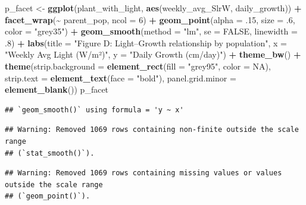 \documentclass[
]{article}
\newenvironment{Shaded}{\begin{snugshade}}{\end{snugshade}}
\newcommand{\AttributeTok}[1]{\textcolor[rgb]{0.13,0.29,0.53}{#1}}
\newcommand{\ConstantTok}[1]{\textcolor[rgb]{0.56,0.35,0.01}{#1}}
\newcommand{\DecValTok}[1]{\textcolor[rgb]{0.00,0.00,0.81}{#1}}
\newcommand{\FunctionTok}[1]{\textcolor[rgb]{0.13,0.29,0.53}{\textbf{#1}}}
\newcommand{\NormalTok}[1]{#1}
\newcommand{\OtherTok}[1]{\textcolor[rgb]{0.56,0.35,0.01}{#1}}
\newcommand{\SpecialCharTok}[1]{\textcolor[rgb]{0.81,0.36,0.00}{\textbf{#1}}}
\newcommand{\StringTok}[1]{\textcolor[rgb]{0.31,0.60,0.02}{#1}}
\begin{document}
\begin{Shaded}
\begin{Highlighting}[]
\NormalTok{p\_facet }\OtherTok{\textless{}{-}} \FunctionTok{ggplot}\NormalTok{(plant\_with\_light,}
                  \FunctionTok{aes}\NormalTok{(weekly\_avg\_SlrW, daily\_growth)) }\SpecialCharTok{+}
  \FunctionTok{facet\_wrap}\NormalTok{(}\SpecialCharTok{\textasciitilde{}}\NormalTok{ parent\_pop, }\AttributeTok{ncol =} \DecValTok{6}\NormalTok{) }\SpecialCharTok{+}
  \FunctionTok{geom\_point}\NormalTok{(}\AttributeTok{alpha =}\NormalTok{ .}\DecValTok{15}\NormalTok{, }\AttributeTok{size =}\NormalTok{ .}\DecValTok{6}\NormalTok{, }\AttributeTok{color =} \StringTok{"grey35"}\NormalTok{) }\SpecialCharTok{+}
  \FunctionTok{geom\_smooth}\NormalTok{(}\AttributeTok{method =} \StringTok{"lm"}\NormalTok{, }\AttributeTok{se =} \ConstantTok{FALSE}\NormalTok{, }\AttributeTok{linewidth =}\NormalTok{ .}\DecValTok{8}\NormalTok{) }\SpecialCharTok{+}
  \FunctionTok{labs}\NormalTok{(}\AttributeTok{title =} \StringTok{"Figure D: Light–Growth relationship by population"}\NormalTok{,}
       \AttributeTok{x =} \StringTok{"Weekly Avg Light (W/m²)"}\NormalTok{,}
       \AttributeTok{y =} \StringTok{"Daily Growth (cm/day)"}\NormalTok{) }\SpecialCharTok{+}
  \FunctionTok{theme\_bw}\NormalTok{() }\SpecialCharTok{+}
  \FunctionTok{theme}\NormalTok{(}\AttributeTok{strip.background =} \FunctionTok{element\_rect}\NormalTok{(}\AttributeTok{fill =} \StringTok{"grey95"}\NormalTok{, }\AttributeTok{color =} \ConstantTok{NA}\NormalTok{),}
        \AttributeTok{strip.text =} \FunctionTok{element\_text}\NormalTok{(}\AttributeTok{face =} \StringTok{"bold"}\NormalTok{),}
        \AttributeTok{panel.grid.minor =} \FunctionTok{element\_blank}\NormalTok{())}
\NormalTok{p\_facet}
\end{Highlighting}
\end{Shaded}

\begin{verbatim}
## `geom_smooth()` using formula = 'y ~ x'
\end{verbatim}

\begin{verbatim}
## Warning: Removed 1069 rows containing non-finite outside the scale range
## (`stat_smooth()`).
\end{verbatim}

\begin{verbatim}
## Warning: Removed 1069 rows containing missing values or values outside the scale range
## (`geom_point()`).
\end{verbatim}
\end{document}
